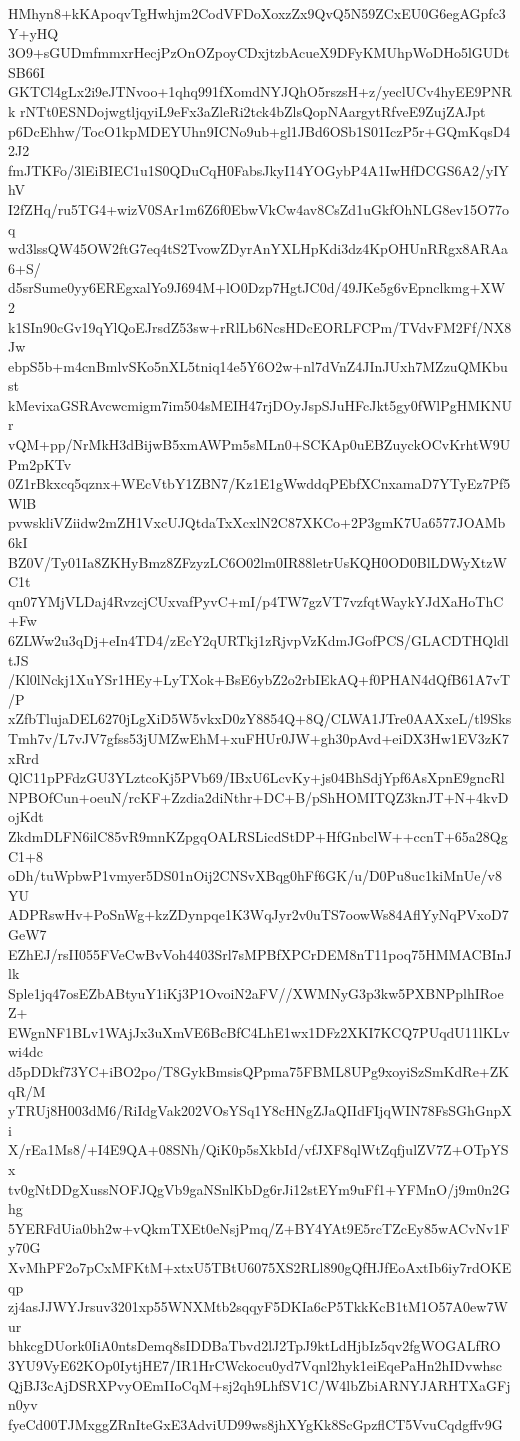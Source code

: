 HMhyn8+kKApoqvTgHwhjm2CodVFDoXoxzZx9QvQ5N59ZCxEU0G6egAGpfc3Y+yHQ
3O9+sGUDmfmmxrHecjPzOnOZpoyCDxjtzbAcueX9DFyKMUhpWoDHo5lGUDtSB66I
GKTCl4gLx2i9eJTNvoo+1qhq991fXomdNYJQhO5rszsH+z/yeclUCv4hyEE9PNRk
rNTt0ESNDojwgtljqyiL9eFx3aZleRi2tck4bZlsQopNAargytRfveE9ZujZAJpt
p6DcEhhw/TocO1kpMDEYUhn9ICNo9ub+gl1JBd6OSb1S01IczP5r+GQmKqsD42J2
fmJTKFo/3lEiBIEC1u1S0QDuCqH0FabsJkyI14YOGybP4A1IwHfDCGS6A2/yIYhV
I2fZHq/ru5TG4+wizV0SAr1m6Z6f0EbwVkCw4av8CsZd1uGkfOhNLG8ev15O77oq
wd3lssQW45OW2ftG7eq4tS2TvowZDyrAnYXLHpKdi3dz4KpOHUnRRgx8ARAa6+S/
d5srSume0yy6EREgxalYo9J694M+lO0Dzp7HgtJC0d/49JKe5g6vEpnclkmg+XW2
k1SIn90cGv19qYlQoEJrsdZ53sw+rRlLb6NcsHDcEORLFCPm/TVdvFM2Ff/NX8Jw
ebpS5b+m4cnBmlvSKo5nXL5tniq14e5Y6O2w+nl7dVnZ4JInJUxh7MZzuQMKbust
kMevixaGSRAvcwcmigm7im504sMEIH47rjDOyJspSJuHFcJkt5gy0fWlPgHMKNUr
vQM+pp/NrMkH3dBijwB5xmAWPm5sMLn0+SCKAp0uEBZuyckOCvKrhtW9UPm2pKTv
0Z1rBkxcq5qznx+WEcVtbY1ZBN7/Kz1E1gWwddqPEbfXCnxamaD7YTyEz7Pf5WlB
pvwskliVZiidw2mZH1VxcUJQtdaTxXcxlN2C87XKCo+2P3gmK7Ua6577JOAMb6kI
BZ0V/Ty01Ia8ZKHyBmz8ZFzyzLC6O02lm0IR88letrUsKQH0OD0BlLDWyXtzWC1t
qn07YMjVLDaj4RvzcjCUxvafPyvC+mI/p4TW7gzVT7vzfqtWaykYJdXaHoThC+Fw
6ZLWw2u3qDj+eIn4TD4/zEcY2qURTkj1zRjvpVzKdmJGofPCS/GLACDTHQldltJS
/Kl0lNckj1XuYSr1HEy+LyTXok+BsE6ybZ2o2rbIEkAQ+f0PHAN4dQfB61A7vT/P
xZfbTlujaDEL6270jLgXiD5W5vkxD0zY8854Q+8Q/CLWA1JTre0AAXxeL/tl9Sks
Tmh7v/L7vJV7gfss53jUMZwEhM+xuFHUr0JW+gh30pAvd+eiDX3Hw1EV3zK7xRrd
QlC11pPFdzGU3YLztcoKj5PVb69/IBxU6LcvKy+js04BhSdjYpf6AsXpnE9gncRl
NPBOfCun+oeuN/rcKF+Zzdia2diNthr+DC+B/pShHOMITQZ3knJT+N+4kvDojKdt
ZkdmDLFN6ilC85vR9mnKZpgqOALRSLicdStDP+HfGnbclW++ccnT+65a28QgC1+8
oDh/tuWpbwP1vmyer5DS01nOij2CNSvXBqg0hFf6GK/u/D0Pu8uc1kiMnUe/v8YU
ADPRswHv+PoSnWg+kzZDynpqe1K3WqJyr2v0uTS7oowWs84AflYyNqPVxoD7GeW7
EZhEJ/rsII055FVeCwBvVoh4403Srl7sMPBfXPCrDEM8nT11poq75HMMACBInJlk
Sple1jq47osEZbABtyuY1iKj3P1OvoiN2aFV//XWMNyG3p3kw5PXBNPplhIRoeZ+
EWgnNF1BLv1WAjJx3uXmVE6BcBfC4LhE1wx1DFz2XKI7KCQ7PUqdU11lKLvwi4dc
d5pDDkf73YC+iBO2po/T8GykBmsisQPpma75FBML8UPg9xoyiSzSmKdRe+ZKqR/M
yTRUj8H003dM6/RiIdgVak202VOsYSq1Y8cHNgZJaQIIdFIjqWIN78FsSGhGnpXi
X/rEa1Ms8/+I4E9QA+08SNh/QiK0p5sXkbId/vfJXF8qlWtZqfjulZV7Z+OTpYSx
tv0gNtDDgXussNOFJQgVb9gaNSnlKbDg6rJi12stEYm9uFf1+YFMnO/j9m0n2Ghg
5YERFdUia0bh2w+vQkmTXEt0eNsjPmq/Z+BY4YAt9E5rcTZcEy85wACvNv1Fy70G
XvMhPF2o7pCxMFKtM+xtxU5TBtU6075XS2RLl890gQfHJfEoAxtIb6iy7rdOKEqp
zj4asJJWYJrsuv3201xp55WNXMtb2sqqyF5DKIa6cP5TkkKcB1tM1O57A0ew7Wur
bhkcgDUork0IiA0ntsDemq8sIDDBaTbvd2lJ2TpJ9ktLdHjbIz5qv2fgWOGALfRO
3YU9VyE62KOp0IytjHE7/IR1HrCWckocu0yd7Vqnl2hyk1eiEqePaHn2hIDvwhsc
QjBJ3cAjDSRXPvyOEmIIoCqM+sj2qh9LhfSV1C/W4lbZbiARNYJARHTXaGFjn0yv
fyeCd00TJMxggZRnIteGxE3AdviUD99ws8jhXYgKk8ScGpzflCT5VvuCqdgffv9G
